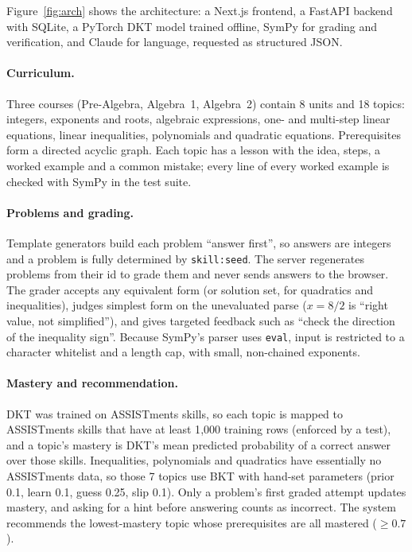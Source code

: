 \documentclass[11pt]{article}
\newcommand{\code}[1]{\texttt{#1}}
\begin{document}
Figure~\ref{fig:arch} shows the architecture: a Next.js frontend, a FastAPI backend with SQLite, a PyTorch DKT model trained offline, SymPy for grading and verification, and Claude for language, requested as structured JSON.

\paragraph{Curriculum.} Three courses (Pre-Algebra, Algebra~1, Algebra~2) contain 8 units and 18 topics: integers, exponents and roots, algebraic expressions, one- and multi-step linear equations, linear inequalities, polynomials and quadratic equations. Prerequisites form a directed acyclic graph. Each topic has a lesson with the idea, steps, a worked example and a common mistake; every line of every worked example is checked with SymPy in the test suite.

\paragraph{Problems and grading.} Template generators build each problem ``answer first'', so answers are integers and a problem is fully determined by \code{skill:seed}. The server regenerates problems from their id to grade them and never sends answers to the browser. The grader accepts any equivalent form (or solution set, for quadratics and inequalities), judges simplest form on the unevaluated parse ($x=8/2$ is ``right value, not simplified''), and gives targeted feedback such as ``check the direction of the inequality sign''. Because SymPy's parser uses \code{eval}, input is restricted to a character whitelist and a length cap, with small, non-chained exponents.

\paragraph{Mastery and recommendation.} DKT was trained on ASSISTments skills, so each topic is mapped to ASSISTments skills that have at least 1{,}000 training rows (enforced by a test), and a topic's mastery is DKT's mean predicted probability of a correct answer over those skills. Inequalities, polynomials and quadratics have essentially no ASSISTments data, so those 7 topics use BKT with hand-set parameters (prior 0.1, learn 0.1, guess 0.25, slip 0.1). Only a problem's first graded attempt updates mastery, and asking for a hint before answering counts as incorrect. The system recommends the lowest-mastery topic whose prerequisites are all mastered ($\geq 0.7$).
\end{document}
